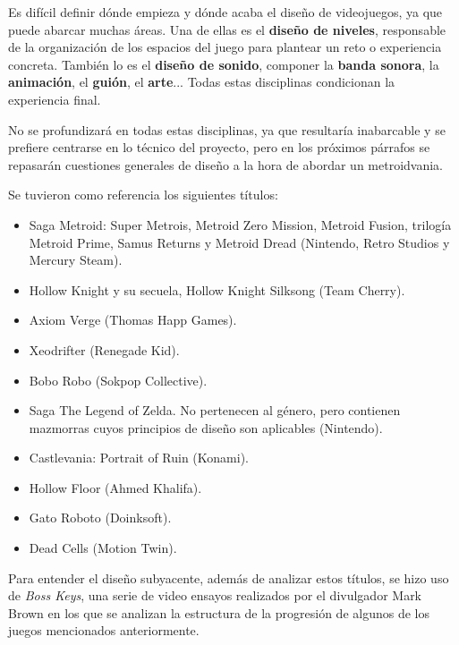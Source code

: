 Es difícil definir dónde empieza y dónde acaba el diseño de videojuegos, ya que puede abarcar muchas áreas. Una de ellas es el \textbf{diseño de niveles}, responsable de la organización de los espacios del juego para plantear un reto o experiencia concreta. También lo es el \textbf{diseño de sonido}, componer la \textbf{banda sonora}, la \textbf{animación}, el \textbf{guión}, el \textbf{arte}... Todas estas disciplinas condicionan la experiencia final. 

No se profundizará en todas estas disciplinas, ya que resultaría inabarcable y se prefiere centrarse en lo técnico del proyecto, pero en los próximos párrafos se repasarán cuestiones generales de diseño a la hora de abordar un metroidvania.

Se tuvieron como referencia los siguientes títulos:

\begin{itemize}
    \item Saga Metroid: Super Metrois, Metroid Zero Mission, Metroid Fusion, trilogía Metroid Prime, Samus Returns y Metroid Dread (Nintendo, Retro Studios y Mercury Steam).
    \item Hollow Knight y su secuela, Hollow Knight Silksong (Team Cherry).
    \item Axiom Verge (Thomas Happ Games).
    \item Xeodrifter (Renegade Kid).
    \item Bobo Robo (Sokpop Collective).
    \item Saga The Legend of Zelda. No pertenecen al género, pero contienen mazmorras cuyos principios de diseño son aplicables (Nintendo).
    \item Castlevania: Portrait of Ruin (Konami).
    \item Hollow Floor (Ahmed Khalifa).
    \item Gato Roboto (Doinksoft).
    \item Dead Cells (Motion Twin).
\end{itemize}

Para entender el diseño subyacente, además de analizar estos títulos, se hizo uso de \textit{Boss Keys}\cite{boss-keys}, una serie de video ensayos realizados por el divulgador Mark Brown en los que se analizan la estructura de la progresión de algunos de los juegos mencionados anteriormente.

